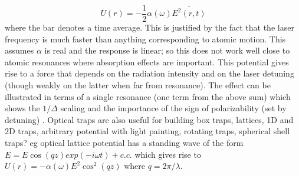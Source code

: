 	$$
	U(r) = -\frac{1}{2} \alpha(\omega)\bar{E^2(r,t)}
	$$
	where the bar denotes a time average. This is justified by the fact that the laser frequency is much faster than anything corresponding to atomic motion. This assumes $\alpha$ is real and the response is linear; so this does not work well close to atomic resonances where absorption effects are important. 
	This potential gives rise to a force that depends on the radiation intensity and on the laser detuning (though weakly on the latter when far from resonance). The effect can be illustrated in terms of a single resonance (one term from the above sum) which shows the $1/\Delta$ scaling and the importance of the sign of polarizability (set by detuning) . Optical traps are also useful for building box traps, lattices, 1D and 2D traps, arbitrary potential with light painting, rotating traps, spherical shell traps? eg optical lattice potential has a standing wave of the form $E = E \cos(qz) exp(-i \omega t) + c.c.$ which gives rise to $U(r) = -\alpha(\omega) E^2 \cos^2(qz)$ where $q=2\pi/\lambda$.

